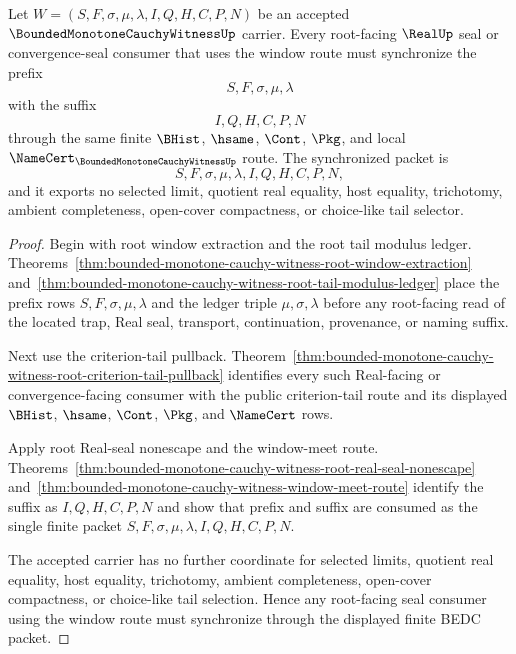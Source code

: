 \begin{theorem}
\label{thm:bounded-monotone-cauchy-witness-root-window-seal-synchronizer}
Let $W=(S,F,\sigma,\mu,\lambda,I,Q,H,C,P,N)$ be an accepted $\BoundedMonotoneCauchyWitnessUp$ carrier. Every root-facing $\RealUp$ seal or convergence-seal consumer that uses the window route must synchronize the prefix
$$
S,F,\sigma,\mu,\lambda
$$
with the suffix
$$
I,Q,H,C,P,N
$$
through the same finite $\BHist$, $\hsame$, $\Cont$, $\Pkg$, and local $\NameCert_{\BoundedMonotoneCauchyWitnessUp}$ route. The synchronized packet is
$$
S,F,\sigma,\mu,\lambda,I,Q,H,C,P,N,
$$
and it exports no selected limit, quotient real equality, host equality, trichotomy, ambient completeness, open-cover compactness, or choice-like tail selector.
\end{theorem}
\begin{proof}
Begin with root window extraction and the root tail modulus ledger. Theorems~\ref{thm:bounded-monotone-cauchy-witness-root-window-extraction} and~\ref{thm:bounded-monotone-cauchy-witness-root-tail-modulus-ledger} place the prefix rows $S,F,\sigma,\mu,\lambda$ and the ledger triple $\mu,\sigma,\lambda$ before any root-facing read of the located trap, Real seal, transport, continuation, provenance, or naming suffix.

Next use the criterion-tail pullback. Theorem~\ref{thm:bounded-monotone-cauchy-witness-root-criterion-tail-pullback} identifies every such Real-facing or convergence-facing consumer with the public criterion-tail route and its displayed $\BHist$, $\hsame$, $\Cont$, $\Pkg$, and $\NameCert$ rows.

Apply root Real-seal nonescape and the window-meet route. Theorems~\ref{thm:bounded-monotone-cauchy-witness-root-real-seal-nonescape} and~\ref{thm:bounded-monotone-cauchy-witness-window-meet-route} identify the suffix as $I,Q,H,C,P,N$ and show that prefix and suffix are consumed as the single finite packet $S,F,\sigma,\mu,\lambda,I,Q,H,C,P,N$.

The accepted carrier has no further coordinate for selected limits, quotient real equality, host equality, trichotomy, ambient completeness, open-cover compactness, or choice-like tail selection. Hence any root-facing seal consumer using the window route must synchronize through the displayed finite BEDC packet.
\end{proof}

